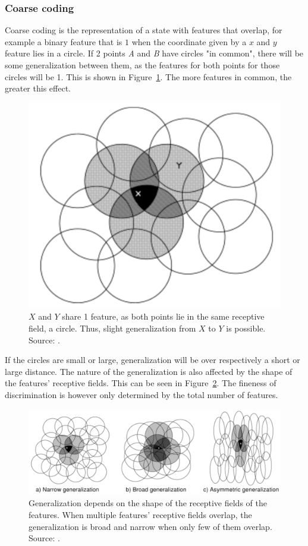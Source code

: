 \documentclass[a4paper, 11pt]{article}
\begin{document}
\subsubsection{Coarse coding}
\label{subs:rl_cc}
Coarse coding is the representation of a state with features that overlap, for example a binary feature that is $1$ when the coordinate given by a $x$ and $y$ feature lies in a circle. If 2 points \textit{A} and \textit{B} have circles "in common", there will be some generalization between them, as the features for both points for those circles will be 1. This is shown in Figure~\ref{fig:coarsecoding1}. The more features in common, the greater this effect.
\begin{figure}[htb]
\captionsetup{width=0.8\textwidth}
\centering
\includegraphics[width=0.5\linewidth]{images/coarsecoding1.png}
\caption[Generalization between points]{$X$ and $Y$ share 1 feature, as both points lie in the same receptive field, a circle. Thus, slight generalization from $X$ to $Y$ is possible. Source: \cite{Sutton1998ReinforcementIntroduction}.}
\label{fig:coarsecoding1}
\end{figure}
If the circles are small or large, generalization will be over respectively a short or large distance. The nature of the generalization is also affected by the shape of the features' receptive fields.  This can be seen in Figure~\ref{fig:coarsecoding2}. The fineness of discrimination is however only determined by the total number of features.
\begin{figure}[htb]
\captionsetup{width=0.8\textwidth}
\centering
\includegraphics[width=0.8\linewidth]{images/coarsecoding2.png}
\caption[Shapes of receptive fields]{Generalization depends on the shape of the receptive fields of the features. When multiple features' receptive fields overlap, the generalization is broad and narrow when only few of them overlap. Source: \cite{Sutton1998ReinforcementIntroduction}.}
\label{fig:coarsecoding2}
\end{figure}
\end{document}
